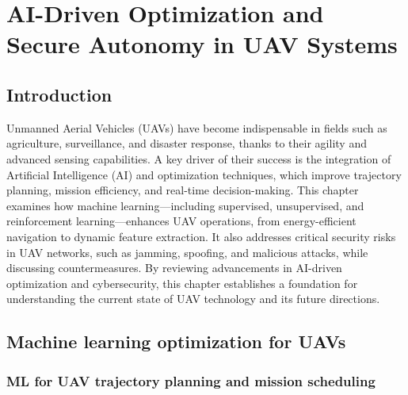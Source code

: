 
\chapter{AI-Driven Optimization and Secure Autonomy in UAV Systems}





\section{Introduction}


Unmanned Aerial Vehicles (UAVs) have become indispensable in fields such as agriculture, surveillance, and disaster response, thanks to their agility and advanced sensing capabilities. A key driver of their success is the integration of Artificial Intelligence (AI) and optimization techniques, which improve trajectory planning, mission efficiency, and real-time decision-making. This chapter examines how machine learning—including supervised, unsupervised, and reinforcement learning—enhances UAV operations, from energy-efficient navigation to dynamic feature extraction. It also addresses critical security risks in UAV networks, such as jamming, spoofing, and malicious attacks, while discussing countermeasures. By reviewing advancements in AI-driven optimization and cybersecurity, this chapter establishes a foundation for understanding the current state of UAV technology and its future directions.





\section{Machine learning optimization for UAVs}






\subsection{ML for UAV trajectory planning and mission scheduling}


